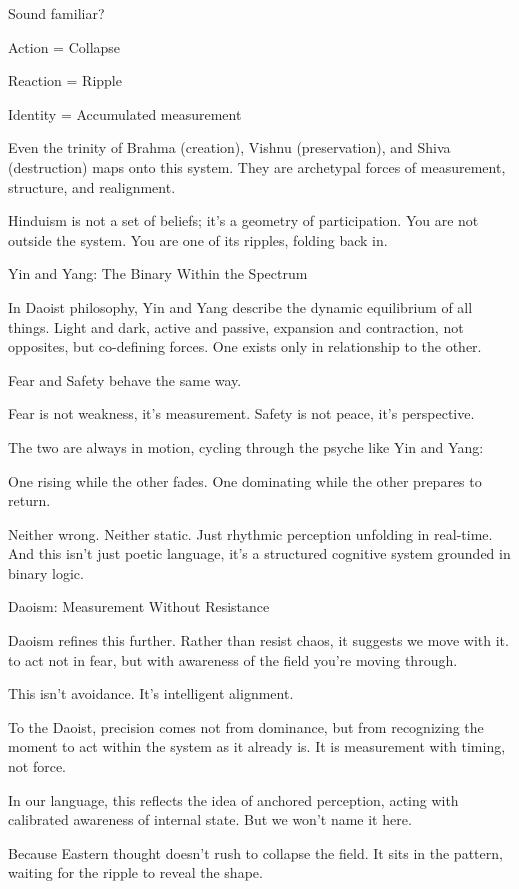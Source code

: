 \documentclass[11pt]{article}
\begin{document}
Sound familiar?

Action = Collapse

Reaction = Ripple

Identity = Accumulated measurement

Even the trinity of Brahma (creation), Vishnu (preservation), and Shiva (destruction) maps onto this system. They are archetypal forces of measurement, structure, and realignment.

Hinduism is not a set of beliefs; it’s a geometry of participation.
You are not outside the system. You are one of its ripples, folding back in.

Yin and Yang: The Binary Within the Spectrum

In Daoist philosophy, Yin and Yang describe the dynamic equilibrium of all things. Light and dark, active and passive, expansion and contraction, not opposites, but co-defining forces. One exists only in relationship to the other.

Fear and Safety behave the same way.

Fear is not weakness, it’s measurement.
Safety is not peace, it’s perspective.

The two are always in motion, cycling through the psyche like Yin and Yang:

One rising while the other fades.
One dominating while the other prepares to return.

Neither wrong. Neither static. Just rhythmic perception unfolding in real-time.
And this isn’t just poetic language, it’s a structured cognitive system grounded in binary logic.

Daoism: Measurement Without Resistance

Daoism refines this further.
Rather than resist chaos, it suggests we move with it.
to act not in fear, but with awareness of the field you're moving through.

This isn’t avoidance. It’s intelligent alignment.

To the Daoist, precision comes not from dominance, but from recognizing the moment to act within the system as it already is. It is measurement with timing, not force.

In our language, this reflects the idea of anchored perception, acting with calibrated awareness of internal state. But we won’t name it here.

Because Eastern thought doesn’t rush to collapse the field.
It sits in the pattern, waiting for the ripple to reveal the shape.
\end{document}
